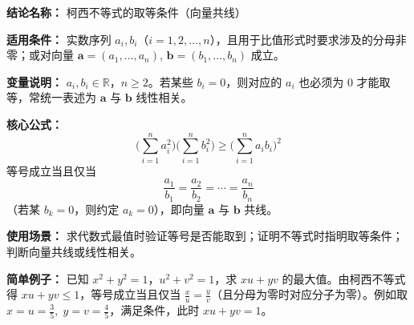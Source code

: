 \textbf{结论名称：} 柯西不等式的取等条件（向量共线）

\textbf{适用条件：} 实数序列 $a_i,b_i$（$i=1,2,\dots,n$），且用于比值形式时要求涉及的分母非零；或对向量 $\boldsymbol{a}=(a_1,\dots,a_n)$, $\boldsymbol{b}=(b_1,\dots,b_n)$ 成立。

\textbf{变量说明：} $a_i,b_i\in\mathbb{R}$，$n\ge 2$。若某些 $b_i=0$，则对应的 $a_i$ 也必须为 $0$ 才能取等，常统一表述为 $\boldsymbol{a}$ 与 $\boldsymbol{b}$ 线性相关。

\textbf{核心公式：}
\[
\biggl(\sum_{i=1}^n a_i^2\biggr)\biggl(\sum_{i=1}^n b_i^2\biggr) \ge \biggl(\sum_{i=1}^n a_i b_i\biggr)^2
\]
等号成立当且仅当
\[
\boxed{\frac{a_1}{b_1} = \frac{a_2}{b_2} = \cdots = \frac{a_n}{b_n}}
\]
（若某 $b_k=0$，则约定 $a_k=0$），即向量 $\boldsymbol{a}$ 与 $\boldsymbol{b}$ 共线。

\textbf{使用场景：} 求代数式最值时验证等号是否能取到；证明不等式时指明取等条件；判断向量共线或线性相关。

\textbf{简单例子：} 已知 $x^2+y^2=1$，$u^2+v^2=1$，求 $xu+yv$ 的最大值。由柯西不等式得 $xu+yv\le 1$，等号成立当且仅当 $\frac{x}{u}=\frac{y}{v}$（且分母为零时对应分子为零）。例如取 $x=u=\frac35,\;y=v=\frac45$，满足条件，此时 $xu+yv=1$。